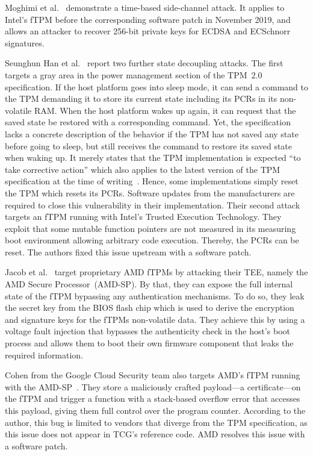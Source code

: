 Moghimi et al.~\cite{Moghimi2019} demonstrate a time-based side-channel attack.
It applies to Intel's \ac{fTPM} before the corresponding software patch in November 2019, and allows an attacker to recover 256-bit private keys for ECDSA and ECSchnorr signatures.

Seunghun Han et al.~\cite{aBadDream} report two further state decoupling attacks.
The first targets a gray area in the power management section of the TPM~2.0 specification.
If the host platform goes into sleep mode, it can send a command to the \ac{TPM} demanding it to store its current state including its \acp{PCR} in its non-volatile RAM\@.
When the host platform wakes up again, it can request that the saved state be restored with a corresponding command.
Yet, the specification lacks a concrete description of the behavior if the \ac{TPM} has not saved any state before going to sleep, but still receives the command to restore its saved state when waking up.
It merely states that the \ac{TPM} implementation is expected ``to take corrective action'' which also applies to the latest version of the \ac{TPM} specification at the time of writing~\cite{tpm20}.
Hence, some implementations simply reset the \ac{TPM} which resets its \acp{PCR}.
Software updates from the manufacturers are required to close this vulnerability in their implementation.
Their second attack targets an \ac{fTPM} running with Intel's Trusted Execution Technology.
They exploit that some mutable function pointers are not measured in its measuring boot environment allowing arbitrary code execution.
Thereby, the \acp{PCR} can be reset.
The authors fixed this issue upstream with a software patch.

Jacob et al.~\cite{Jacob2023} target proprietary AMD fTPMs by attacking their \ac{TEE}, namely the AMD Secure Processor~(AMD-SP).
By that, they can expose the full internal state of the \ac{fTPM} bypassing any authentication mechanisms.
To do so, they leak the secret key from the BIOS flash chip which is used to derive the encryption and signature keys for the \acp{fTPM} non-volatile data.
They achieve this by using a voltage fault injection that bypasses the authenticity check in the host's boot process and allows them to boot their own firmware component that leaks the required information.

Cohen from the Google Cloud Security team also targets AMD's fTPM running with the AMD-SP~\cite{cohen}.
They store a maliciously crafted payload---a certificate---on the \ac{fTPM} and trigger a function with a stack-based overflow error that accesses this payload, giving them full control over the program counter.
According to the author, this bug is limited to vendors that diverge from the \ac{TPM} specification, as this issue does not appear in \ac{TCG}'s reference code.
AMD resolves this issue with a software patch.

